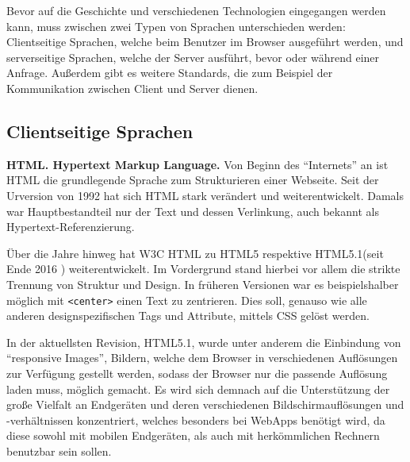 \documentclass[a4paper,12pt,ngerman,listof=numbered]{scrartcl}      %
\let\oldcite\cite
\renewcommand{\cite}[1]{\textsuperscript{\oldcite{#1}}}
\providecommand{\inlinecode}[1]{\texttt{#1}}
\begin{document}
	Bevor auf die Geschichte und verschiedenen Technologien eingegangen werden kann, muss zwischen zwei Typen von Sprachen unterschieden werden: Clientseitige Sprachen, welche beim Benutzer im Browser ausgeführt werden, und serverseitige Sprachen, welche der Server ausführt, bevor oder während einer Anfrage. Außerdem gibt es weitere Standards, die zum Beispiel der Kommunikation zwischen Client und Server dienen.\par
	
	\subsection{Clientseitige Sprachen}
	
	\textbf{HTML. Hypertext Markup Language.} Von Beginn des ``Internets'' an ist HTML die grundlegende Sprache zum Strukturieren einer Webseite. Seit der Urversion von 1992 hat sich HTML stark verändert und weiterentwickelt. Damals war Hauptbestandteil nur der Text und dessen Verlinkung, auch bekannt als Hypertext-Referenzierung.\cite{htmlWiki}\par
	Über die Jahre hinweg hat W3C HTML zu HTML5 respektive HTML5.1(seit Ende 2016 \cite{html51}) weiterentwickelt. Im Vordergrund stand hierbei vor allem die strikte Trennung von Struktur und Design. In früheren Versionen war es beispielshalber möglich mit \inlinecode{<center>} einen Text zu zentrieren. Dies soll, genauso wie alle anderen designspezifischen Tags und Attribute, mittels CSS gelöst werden.\par
	In der aktuellsten Revision, HTML5.1, wurde unter anderem die Einbindung von ``responsive Images'', Bildern, welche dem Browser in verschiedenen Auflösungen zur Verfügung gestellt werden, sodass der Browser nur die passende Auflösung laden muss, möglich gemacht. Es wird sich demnach auf die Unterstützung der große Vielfalt an Endgeräten und deren verschiedenen Bildschirmauflösungen und -verhältnissen konzentriert, welches besonders bei WebApps benötigt wird, da diese sowohl mit mobilen Endgeräten, als auch mit herkömmlichen Rechnern benutzbar sein sollen.\cite{html51blog}\par
	
\end{document}
